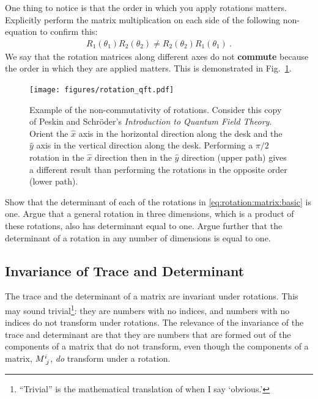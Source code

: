 \documentclass[12pt]{article}
\begin{document}
\begin{exercise}
One thing to notice is that the order in which you apply rotations matters. Explicitly perform the matrix multiplication on each side of the following non-equation to confirm this:
\begin{align}
    R_1(\theta_1) R_2(\theta_2) \neq R_2(\theta_2) R_1(\theta_1) \ .
\end{align}
We say that the rotation matrices along different axes do not \textbf{commute} because the order in which they are applied matters. This is demonstrated in Fig.~\ref{fig:rotate:QFT}.
\end{exercise}


\begin{figure}[tb]
    \centering
    \texttt{[image: figures/rotation\_qft.pdf]}
    \caption{Example of the non-commutativity of rotations. Consider this copy of Peskin and Schr\"oder's \emph{Introduction to Quantum Field Theory}. Orient the $\hat x$ axis in the horizontal direction along the desk and the $\hat y$ axis in the vertical direction along the desk. Performing a $\pi/2$ rotation in the $\hat x$ direction then in the $\hat y$ direction (upper path) gives a different result than performing the rotations in the opposite order (lower path).}
    \label{fig:rotate:QFT}
\end{figure}

\begin{exercise}
Show that the determinant of each of the rotations in \eqref{eq:rotation:matrix:basic} is one. Argue that a general rotation in three dimensions, which is a product of these rotations, also has determinant equal to one. Argue further that the determinant of a rotation in any number of dimensions is equal to one.
\end{exercise}

\subsection{Invariance of Trace and Determinant}

The trace and the determinant of a matrix are invariant under rotations. This may sound trivial\footnote{``Trivial'' is the mathematical translation of when I say `obvious.'}: they are numbers with no indices, and numbers with no indices do not transform under rotations. The relevance of the invariance of the trace and determinant are that they are numbers that are formed out of the components of a matrix that do not transform, even though the components of a matrix, $M\aij{i}{j}$, \emph{do} transform under a rotation. 
\end{document}
